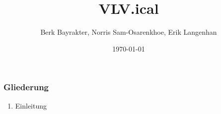 \documentclass[10pt]{beamer}
\author{Berk Bayrakter, Norris Sam-Osarenkhoe, Erik Langenhan}
\title{VLV.ical}
\date{\today}
\begin{document}
\frame{\titlepage}

\begin{frame}
    \frametitle{Gliederung}
    \begin{enumerate}
        \item{Einleitung}
    \end{enumerate}

\end{frame}
\end{document}
